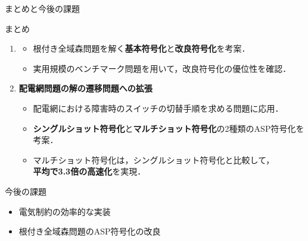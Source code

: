 \documentclass[dvipdfmx,11pt]{beamer}
\begin{document}
\begin{frame}{まとめと今後の課題}
 \begin{block}{まとめ}
 \begin{enumerate}
   \item {}
   \begin{itemize}
    \item 根付き全域森問題を解く\textbf{基本符号化}と\textbf{改良符号化}を考案．
    \item 実用規模のベンチマーク問題を用いて，改良符号化の優位性を確認．
   \end{itemize}
   \item \alert{\bf 配電網問題の解の遷移問題への拡張}
   \begin{itemize}
    \item 配電網における障害時のスイッチの切替手順を求める問題に応用．
    \item \textbf{シングルショット符号化}と\textbf{マルチショット符号化}の2種類のASP符号化を考案．
    \item マルチショット符号化は，シングルショット符号化と比較して，\\ 
          \textbf{平均で3.3倍の高速化}を実現．
   \end{itemize}
 \end{enumerate}
 \end{block}
 \vfill
 \begin{alertblock}{今後の課題}
  \begin{itemize}
   \item 電気制約の効率的な実装
   \item 根付き全域森問題のASP符号化の改良
  \end{itemize}
 \end{alertblock}
\end{frame}
\end{document}
